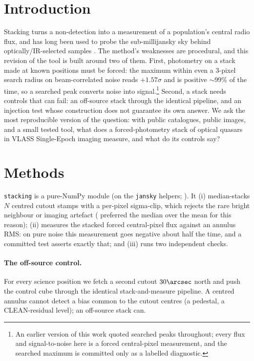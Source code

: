 \documentclass[twocolumn]{aastex631}
\newcommand{\code}[1]{\texttt{#1}}
\begin{document}
\section{Introduction}
Stacking turns a non-detection into a measurement of a population's central radio flux, and has long
been used to probe the sub-millijansky sky behind optically/IR-selected samples
\citep{white2007,karim2011,lindroos2015}. The method's weaknesses are procedural, and this revision
of the tool is built around two of them. First, photometry on a stack made at known positions
must be forced: the maximum within even a 3-pixel search radius on beam-correlated noise reads
$+1.57\sigma$ and is positive $\sim$99\% of the time, so a searched peak converts noise into
signal.\footnote{An earlier version of this work quoted searched peaks throughout; every flux and
signal-to-noise here is a forced central-pixel measurement, and the searched maximum is committed
only as a labelled diagnostic.} Second, a stack needs controls that can fail: an off-source stack
through the identical pipeline, and an injection test whose construction does not guarantee its own
answer. We ask the most reproducible version of the question: with public catalogues, public images,
and a small tested tool, what does a forced-photometry stack of optical quasars in VLASS Single-Epoch
imaging measure, and what do its controls say?

\section{Methods}
\code{stacking} is a pure-NumPy module (on the \code{jansky} helpers; \citealt{jansky}). It
(i) median-stacks $N$ centred cutout stamps with a per-pixel sigma-clip, which rejects the rare
bright neighbour or imaging artefact (\citealt{white2007} preferred the median over the mean for
this reason); (ii) measures the stacked forced central-pixel flux against an annulus RMS: on pure
noise this measurement goes negative about half the time, and a committed test asserts
exactly that; and (iii) runs two independent checks.

\paragraph{The off-source control.} For every science position we fetch a second cutout $30\arcsec$
north and push the control cube through the identical stack-and-measure pipeline. A centred annulus
cannot detect a bias common to the cutout centres (a pedestal, a CLEAN-residual level); an
off-source stack can.
\end{document}
